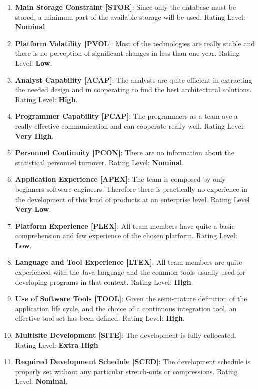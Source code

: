 \begin{enumerate}
        \item \textbf{Main Storage Constraint [STOR]}: Since only the database must be stored, a minimum part of the available storage will be used. Rating Level: \textbf{Nominal}.
        
        \item \textbf{Platform Volatility [PVOL]}: Most of the technologies are really stable and there is no perception of significant changes in less than one year. Rating Level: \textbf{Low}.
        
        \item \textbf{Analyst Capability [ACAP]}: The analysts are quite efficient in extracting the needed design and in cooperating to find the best architectural solutions. Rating Level: \textbf{High}.
        
        \item \textbf{Programmer Capability [PCAP]}: The programmers as a team ave a really effective communication and can cooperate really well. Rating Level: \textbf{Very High}.
        
        \item \textbf{Personnel Continuity [PCON]}: There are no information about the statistical personnel turnover. Rating Level: \textbf{Nominal}.
        
        \item \textbf{Application Experience [APEX]}: The team is composed by only beginners software engineers. Therefore there is practically no experience in the development of this kind of products at an enterprise level. Rating Level \textbf{Very Low}.
        
        \item \textbf{Platform Experience [PLEX]}: All team members have quite a basic comprehension and few experience of the chosen platform. Rating Level: \textbf{Low}.
        
        \item \textbf{Language and Tool Experience [LTEX]}: All team members are quite experienced with the Java language and the common tools usually used for developing programs in that context. Rating Level: \textbf{High}.
        
        \item \textbf{Use of Software Tools [TOOL]}: Given the semi-mature definition of the application life cycle, and the choice of a continuous integration tool, an effective tool set has been defined. Rating Level: \textbf{High}.
        
        \item \textbf{Multisite Development [SITE]}: The development is fully collocated. Rating Level: \textbf{Extra High}
        
        \item \textbf{Required Development Schedule [SCED]}: The development schedule is properly set without any particular stretch-outs or compressions. Rating Level: \textbf{Nominal}.
        
    \end{enumerate}
    
